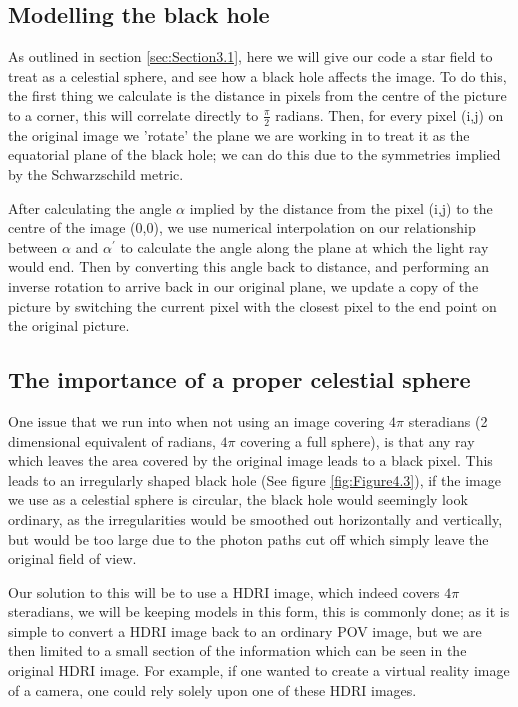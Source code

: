 \documentclass[oneside,openright,frontopenright, singlespacing]{dmathesis}
\begin{document}
\subsection{Modelling the black hole}\label{subsec:Subsection3.5.4}
	
	As outlined in section \ref{sec:Section3.1}, here we will give our code a star field to treat as a celestial sphere, and see how a black hole affects the image. To do this, the first thing we calculate is the distance in pixels from the centre of the picture to a corner, this will correlate directly to $\frac{\pi}{2}$ radians. Then, for every pixel (i,j) on the original image we 'rotate' the plane we are working in to treat it as the equatorial plane of the black hole; we can do this due to the symmetries implied by the Schwarzschild metric. 

\vspace{1em}
	After calculating the angle $\alpha$ implied by the distance from the pixel (i,j) to the centre of the image (0,0), we use numerical interpolation on our relationship between $\alpha$ and $\alpha^{'}$ to calculate the angle along the plane at which the light ray would end. Then by converting this angle back to distance, and performing an inverse rotation to arrive back in our original plane, we update a copy of the picture by switching the current pixel with the closest pixel to the end point on the original picture.

\subsection{The importance of a proper celestial sphere}\label{subsec:Subsection3.5.5}

	One issue that we run into when not using an image covering $4\pi$ steradians (2 dimensional equivalent of radians, $4\pi$ covering a full sphere), is that any ray which leaves the area covered by the original image leads to a black pixel. This leads to an irregularly shaped black hole (See figure \ref{fig:Figure4.3}), if the image we use as a celestial sphere is circular, the black hole would seemingly look ordinary, as the irregularities would be smoothed out horizontally and vertically, but would be too large due to the photon paths cut off which simply leave the original field of view. 

\vspace{1em}
	Our solution to this will be to use a HDRI image, which indeed covers $4\pi$ steradians, we will be keeping models in this form, this is commonly done; as it is simple to convert a HDRI image back to an ordinary POV image, but we are then limited to a small section of the information which can be seen in the original HDRI image. For example, if one wanted to create a virtual reality image of a camera, one could rely solely upon one of these HDRI images.
\end{document}
